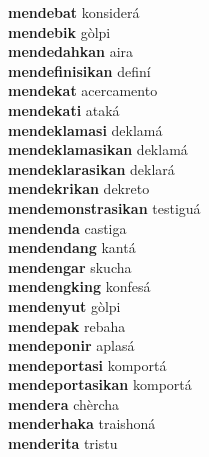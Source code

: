 \textbf{mendebat } konsiderá \\
\textbf{mendebik } gòlpi \\
\textbf{mendedahkan } aira \\
\textbf{mendefinisikan } definí \\
\textbf{mendekat } acercamento \\
\textbf{mendekati } ataká \\
\textbf{mendeklamasi } deklamá \\
\textbf{mendeklamasikan } deklamá \\
\textbf{mendeklarasikan } deklará \\
\textbf{mendekrikan } dekreto \\
\textbf{mendemonstrasikan } testiguá \\
\textbf{mendenda } castiga \\
\textbf{mendendang } kantá \\
\textbf{mendengar } skucha \\
\textbf{mendengking } konfesá \\
\textbf{mendenyut } gòlpi \\
\textbf{mendepak } rebaha \\
\textbf{mendeponir } aplasá \\
\textbf{mendeportasi } komportá \\
\textbf{mendeportasikan } komportá \\
\textbf{mendera } chèrcha \\
\textbf{menderhaka } traishoná \\
\textbf{menderita } tristu \\
